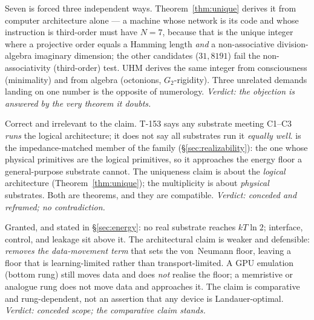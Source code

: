 \begin{redteambox}
Seven is forced three independent ways. Theorem~\ref{thm:unique} derives it
from computer architecture alone --- a machine whose network is its code and
whose instruction is third-order must have $N=7$, because that is the unique
integer where a projective order equals a Hamming length \emph{and} a
non-associative division-algebra imaginary dimension; the other candidates
($31, 8191$) fail the non-associativity (third-order) test. UHM derives the
same integer from consciousness (minimality) and from algebra (octonions,
$G_2$-rigidity). Three unrelated demands landing on one number is the
opposite of numerology. \emph{Verdict: the objection is answered by the very
theorem it doubts.}
\end{redteambox}

\begin{redteambox}
Correct and irrelevant to the claim. T-153 says any substrate meeting
C1--C3 \emph{runs} the logical architecture; it does not say all substrates
run it \emph{equally well}. \TALOS{} is the impedance-matched member of the
family (\S\ref{sec:realizability}): the one whose physical primitives are the
logical primitives, so it approaches the energy floor a general-purpose
substrate cannot. The uniqueness claim is about the \emph{logical}
architecture (Theorem~\ref{thm:unique}); the multiplicity is about
\emph{physical} substrates. Both are theorems, and they are compatible.
\emph{Verdict: conceded and reframed; no contradiction.}
\end{redteambox}

\begin{redteambox}
Granted, and stated in \S\ref{sec:energy}: no real substrate reaches
$kT\ln2$; interface, control, and leakage sit above it. The architectural
claim is weaker and defensible: \TALOS{} \emph{removes the data-movement
term} that sets the von~Neumann floor, leaving a floor that is
learning-limited rather than transport-limited. A GPU emulation (bottom rung)
still moves data and does \emph{not} realise the floor; a memristive or
analogue rung does not move data and approaches it. The claim is comparative
and rung-dependent, not an assertion that any \TALOS{} device is Landauer-optimal.
\emph{Verdict: conceded scope; the comparative claim stands.}
\end{redteambox}

